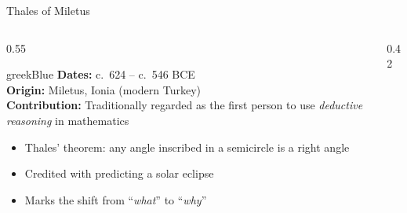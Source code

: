 \begin{frame}[shrink=5]{Thales of Miletus}

  \begin{columns}[T]
    \begin{column}{0.55\textwidth}
      \begin{personbox}[Thales of Miletus (Thal\={e}s ho Mil\={e}sios)]{greekBlue}
        \small
        \textbf{Dates:} c.\ 624 -- c.\ 546 BCE\\
        \textbf{Origin:} Miletus, Ionia (modern Turkey)\\
        \textbf{Contribution:} Traditionally regarded as the first person to use
        \emph{deductive reasoning} in mathematics
      \end{personbox}

      \vspace{0.5em}
      \begin{itemize}
        \item \alert{Thales' theorem:} any angle inscribed in a semicircle is a right angle
        \item Credited with predicting a solar eclipse
        \item Marks the shift from ``\emph{what}'' to ``\emph{why}''
      \end{itemize}
    \end{column}

    \begin{column}{0.42\textwidth}

      \vspace{0.5em}
    \end{column}
  \end{columns}

\end{frame}

